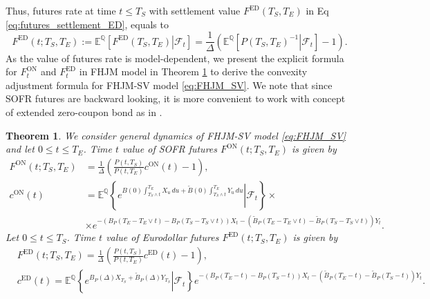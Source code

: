 \documentclass[pdftex,11pt,a4paper] {article}
\newtheorem{theorem}{Theorem}[section]
\begin{document}
Thus, futures rate at time $t\le T_S$ with settlement value $F^{\mathrm{ED}}(T_S,T_E)$ in Eq \eqref{eq:futures_settlement_ED}, equals to
\begin{equation}\label{eq:marting_futures_ED}
F^{\mathrm{ED}}(t;T_S,T_E):=\mathbb{E}^{\mathbb{Q}}\left[\left.F^{\mathrm{ED}}(T_S,T_E)\right|\mathcal{F}_t\right]=
\frac{1}{\Delta}\left(\mathbb{E}^{\mathbb{Q}}\left[\left.P(T_S,T_E)^{-1}\right|\mathcal{F}_t\right]-1\right).
\end{equation}
As the value of futures rate is model-dependent, we present the explicit formula for $F^{\mathrm{ON}}_t$ and $F^{\mathrm{ED}}_t$ in FHJM model in Theorem \ref{prop:futures_convexity} to derive the convexity adjustment formula for FHJM-SV model \eqref{eq:FHJM_SV}. We note that since SOFR futures are backward looking, it is more convenient to work with concept of extended zero-coupon bond as in \cite{Lyashenko2019}. 



\begin{theorem}\label{prop:futures_convexity}
We consider general dynamics of FHJM-SV model \eqref{eq:FHJM_SV} and let $0\le t\le T_E$. Time $t$ value of SOFR futures $F^{\mathrm{ON}}(t;T_S,T_E)$ is given by
\begin{equation}\label{eq:fut_rate_ON}
\begin{split}
F^{\mathrm{ON}}(t;T_S,T_E)&=\frac{1}{\Delta}\left(\frac{P(t,T_S)}{P(t,T_E)}c^{\mathrm{ON}}(t)-1\right),\\
c^{\mathrm{ON}}(t)&=\mathbb{E}^{\mathbb{Q}}\left\{\left.e^{B(0)\int_{T_S\wedge t}^{T_E}X_u\,du+\tilde{B}(0)\int_{T_S\wedge t}^{T_E}Y_u\,du} \right|\mathcal{F}_t\right\} \times \\
&\times e^{-\left(B_P(T_E-T_E\vee t)-B_P(T_S-T_S\vee t)\right)X_t-\left(\tilde B_P(T_E-T_E\vee t)-\tilde B_P(T_S-T_S\vee t)\right)Y_t}.
\end{split}
\end{equation}
Let $0\le t\le T_S$. Time $t$ value of Eurodollar futures $F^{\mathrm{ED}}(t;T_S,T_E)$ is given by
\begin{equation}\label{eq:fut_rate_ED}
\begin{split}
&F^{\mathrm{ED}}(t;T_S,T_E)=\frac{1}{\Delta}\left(\frac{P(t,T_S)}{P(t,T_E)}c^{\mathrm{ED}}(t)-1\right),\\
&c^{\mathrm{ED}}(t)=\mathbb{E}^{\mathbb{Q}}\left\{\left.e^{B_P(\Delta)X_{T_S}+\tilde{B}_P(\Delta)Y_{T_S}}\right|\mathcal{F}_t\right\} e^{-\left(B_P(T_E-t)-B_P(T_S-t)\right)X_t-\left(\tilde{B}_P(T_E-t)-\tilde{B}_P(T_S-t)\right)Y_t}.
\end{split}
\end{equation}
\end{theorem}
\end{document}
